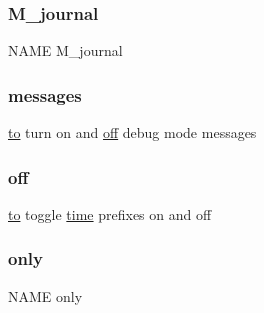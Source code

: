 \subsubsection{\texorpdfstring{M\+\_\+journal}{M\_journal}}
{\footnotesize\ttfamily N\+A\+ME M\+\_\+journal}

\mbox{\label{M__journal_83_8txt_a5eba9a740074bb5543b282f824b639f7}} 
\subsubsection{\texorpdfstring{messages}{messages}}
{\footnotesize\ttfamily \hyperlink{M__stopwatch_83_8txt_a97209fd3e34ef701c0a9734280779cbb}{to} turn on and \hyperlink{M__journal_83_8txt_aa2578e680a7580a9d4666b72a93e6a53}{off} debug mode messages}

\mbox{\label{M__journal_83_8txt_aa2578e680a7580a9d4666b72a93e6a53}} 
\subsubsection{\texorpdfstring{off}{off}}
{\footnotesize\ttfamily \hyperlink{M__stopwatch_83_8txt_a97209fd3e34ef701c0a9734280779cbb}{to} toggle \hyperlink{M__stopwatch_83_8txt_a1091fdf3a4e66042d1571c7e4ade98dd}{time} prefixes on and off}

\mbox{\label{M__journal_83_8txt_a22c3378cbcd6f468bf7f38bb18fa456d}} 
\subsubsection{\texorpdfstring{only}{only}}
{\footnotesize\ttfamily N\+A\+ME only}


